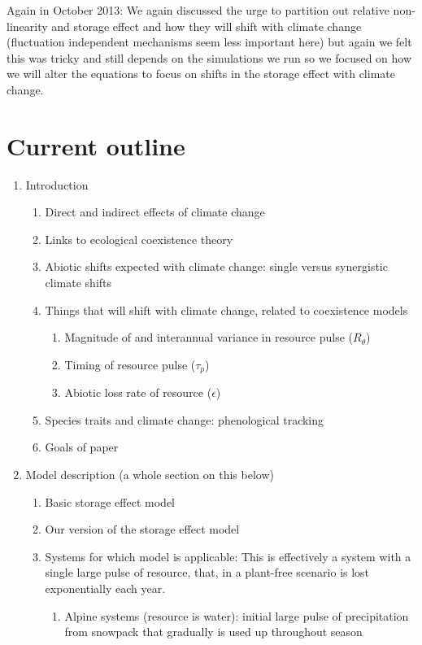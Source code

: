 \documentclass[11pt,a4paper,oneside]{article}
\begin{document}
Again in October 2013: We again discussed the urge to partition out relative non-linearity and storage effect and how they will shift with climate change (fluctuation independent mechanisms seem less important here) but again we felt this was tricky and still depends on the simulations we run so we focused on how we will alter the equations to focus on shifts in the storage effect with climate change.


\section{Current outline}
\begin{enumerate}
\item Introduction
\begin{enumerate}
\item Direct and indirect effects of climate change
\item Links to ecological coexistence theory
\item Abiotic shifts expected with climate change: single versus
  synergistic climate shifts
\item Things that will shift with climate change, related to
  coexistence models
\begin{enumerate}
\item Magnitude of and interannual variance in resource pulse (\(R_{\theta}\))
\item Timing of resource pulse (\(\tau_{p}\))
\item Abiotic loss rate of resource (\(\epsilon\))
\end{enumerate}
\item Species traits and climate change: phenological tracking
\item Goals of paper
\end{enumerate}
\item Model description (a whole section on this below)
\begin{enumerate}
\item Basic storage effect model
\item Our version of the storage effect model
\item Systems for which model is applicable: This is effectively a system with a single large pulse of
resource, that, in a plant-free scenario is lost exponentially each
year. 
\begin{enumerate}
\item Alpine systems (resource is water): initial large pulse of precipitation from
  snowpack that gradually is used up  throughout season

\end{enumerate}
\end{enumerate}
\end{enumerate}
\end{document}
